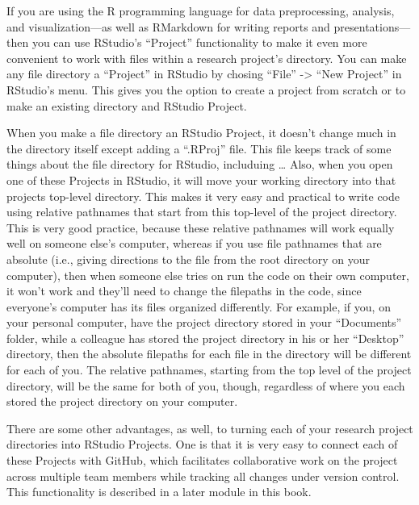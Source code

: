 \documentclass[]{tufte-book}
\begin{document}
If you are using the R programming language for data preprocessing, analysis,
and visualization---as well as RMarkdown for writing reports and
presentations---then you can use RStudio's ``Project'' functionality to make it
even more convenient to work with files within a research project's directory.
You can make any file directory a ``Project'' in RStudio by chosing ``File'' -\textgreater{}
``New Project'' in RStudio's menu. This gives you the option to create a
project from scratch or to make an existing directory and RStudio Project.

When you make a file directory an RStudio Project, it doesn't change much in
the directory itself except adding a ``.RProj'' file. This file keeps track of
some things about the file directory for RStudio, includuing \ldots{} Also, when you
open one of these Projects in RStudio, it will move your working directory
into that projects top-level directory. This makes it very easy and practical
to write code using relative pathnames that start from this top-level of the
project directory. This is very good practice, because these relative pathnames
will work equally well on someone else's computer, whereas if you use file
pathnames that are absolute (i.e., giving directions to the file from the root
directory on your computer), then when someone else tries on run the code on their
own computer, it won't work and they'll need to change the filepaths in the code,
since everyone's computer has its files organized differently. For example, if you,
on your personal computer, have the project directory stored in your ``Documents''
folder, while a colleague has stored the project directory in his or her ``Desktop''
directory, then the absolute filepaths for each file in the directory will be
different for each of you. The relative pathnames, starting from the top level of
the project directory, will be the same for both of you, though, regardless of
where you each stored the project directory on your computer.

There are some other advantages, as well, to turning each of your research
project directories into RStudio Projects. One is that it is very easy to
connect each of these Projects with GitHub, which facilitates collaborative work
on the project across multiple team members while tracking all changes under
version control. This functionality is described in a later module in this book.
\end{document}
